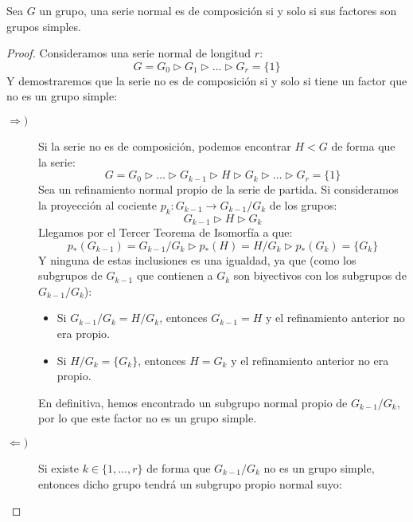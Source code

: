 \begin{prop}
    Sea $G$ un grupo, una serie normal es de composición si y solo si sus factores son grupos simples.
    \begin{proof}
        Consideramos una serie normal de longitud $r$:
        \begin{equation*}
            G = G_0 \rhd G_1 \rhd \ldots \rhd G_r = \{1\}
        \end{equation*}
        Y demostraremos que la serie no es de composición si y solo si tiene un factor que no es un grupo simple:
        \begin{description}
            \item [$\Longrightarrow)$] Si la serie no es de composición, podemos encontrar $H<G$ de forma que la serie:
                \begin{equation*}
                    G = G_0 \rhd \ldots \rhd G_{k-1} \rhd H \rhd G_k \rhd \ldots \rhd G_r = \{1\}
                \end{equation*}
                Sea un refinamiento normal propio de la serie de partida. Si consideramos la proyección al cociente $p_k:G_{k-1}\to G_{k-1}/G_k$ de los grupos:
                \begin{equation*}
                    G_{k-1} \rhd H \rhd G_k
                \end{equation*}
                Llegamos por el Tercer Teorema de Isomorfía a que:
                \begin{equation*}
                    p_\ast(G_{k-1}) = G_{k-1}/G_k \rhd p_\ast(H) = H/G_k \rhd p_\ast(G_k) = \{G_k\}
                \end{equation*}
                Y ninguna de estas inclusiones es una igualdad, ya que (como los subgrupos de $G_{k-1}$ que contienen a $G_k$ son biyectivos con los subgrupos de $G_{k-1}/G_k$):
                \begin{itemize}
                    \item Si $G_{k-1}/G_k = H/G_k$, entonces $G_{k-1} = H$ y el refinamiento anterior no era propio.
                    \item Si $H/G_k = \{G_k\}$, entonces $H = G_k$ y el refinamiento anterior no era propio.
                \end{itemize}
                En definitiva, hemos encontrado un subgrupo normal propio de $G_{k-1}/G_k$, por lo que este factor no es un grupo simple.
            \item [$\Longleftarrow)$] Si existe $k\in \{1,\ldots,r\}$ de forma que $G_{k-1}/G_k$ no es un grupo simple, entonces dicho grupo tendrá un subgrupo propio normal suyo:

\end{description}
\end{proof}
\end{prop}
